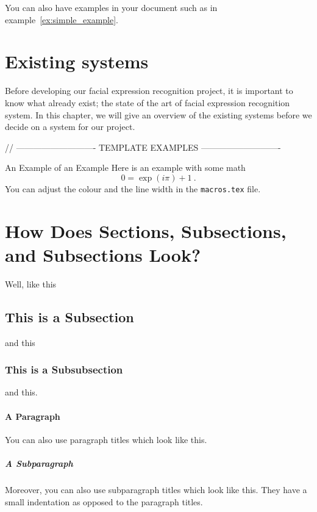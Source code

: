 You can also have examples in your document such as in example~\ref{ex:simple_example}.

\section{Existing systems}

Before developing our facial expression recognition project, it is important to know what already exist; the state of the art of facial expression recognition system. In this chapter, we will give an overview of the existing systems before we decide on a system for our project.

// ---------------------------- TEMPLATE EXAMPLES ---------------------------- 

\begin{example}{An Example of an Example}
  \label{ex:simple_example}
  Here is an example with some math
  \begin{equation}
    0 = \exp(i\pi)+1\ .
  \end{equation}
  You can adjust the colour and the line width in the {\tt macros.tex} file.
\end{example}

\section{How Does Sections, Subsections, and Subsections Look?}
Well, like this
\subsection{This is a Subsection}
and this
\subsubsection{This is a Subsubsection}
and this.

\paragraph{A Paragraph}
You can also use paragraph titles which look like this.

\subparagraph{A Subparagraph} Moreover, you can also use subparagraph titles which look like this. They have a small indentation as opposed to the paragraph titles.

